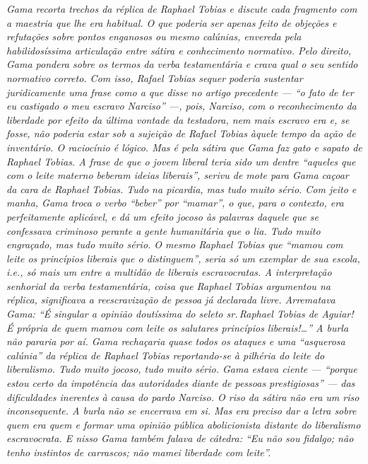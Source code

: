 \begin{didascalia}
\emph{Gama recorta trechos da réplica de Raphael Tobias e discute cada
fragmento com a maestria que lhe era habitual. O que poderia ser apenas
feito de objeções e refutações sobre pontos enganosos ou mesmo calúnias,
envereda pela habilidosíssima articulação entre sátira e conhecimento
normativo. Pelo direito, Gama pondera sobre os termos da verba
testamentária e crava qual o seu sentido normativo correto. Com isso,
Rafael Tobias sequer poderia sustentar juridicamente uma frase como a
que disse no artigo precedente --- ``o fato de ter eu castigado o meu
escravo Narciso'' ---, pois, Narciso, com o reconhecimento da liberdade por
efeito da última vontade da testadora, nem mais escravo era e, se fosse,
não poderia estar sob a sujeição de Rafael Tobias àquele tempo da ação
de inventário. O raciocínio é lógico. Mas é pela sátira que Gama faz
gato e sapato de Raphael Tobias. A frase de que o jovem liberal teria
sido um dentre ``aqueles que com o leite materno beberam ideias
liberais'', serivu de mote para Gama caçoar da cara de Raphael Tobias.
Tudo na picardia, mas tudo muito sério. Com jeito e manha, Gama troca o
verbo ``beber'' por ``mamar'', o que, para o contexto, era perfeitamente
aplicável, e dá um efeito jocoso às palavras daquele que se confessava
criminoso perante a gente humanitária que o lia. Tudo muito engraçado,
mas tudo muito sério. O mesmo Raphael Tobias que ``mamou com leite os
princípios liberais que o distinguem'', seria só um exemplar de sua
escola, i.e., só mais um entre a multidão de liberais escravocratas. A
interpretação senhorial da verba testamentária, coisa que Raphael Tobias
argumentou na réplica, significava a reescravização de pessoa já
declarada livre. Arrematava Gama: ``É singular a opinião doutíssima do
seleto sr.\,Raphael Tobias de Aguiar! É própria de quem mamou com leite
os salutares princípios liberais!\ldots'' A burla não pararia por aí.
Gama rechaçaria quase todos os ataques e uma ``asquerosa calúnia'' da
réplica de Raphael Tobias reportando-se à pilhéria do leite do
liberalismo. Tudo muito jocoso, tudo muito sério. Gama estava ciente ---
``porque estou certo da impotência das autoridades diante de pessoas
prestigiosas'' --- das dificuldades inerentes à causa do pardo Narciso. O
riso da sátira não era um riso inconsequente. A burla não se encerrava
em si. Mas era preciso dar a letra sobre quem era quem e formar uma
opinião pública abolicionista distante do liberalismo escravocrata. E
nisso Gama também falava de cátedra: ``Eu não sou fidalgo; não tenho
instintos de carrascos; não mamei liberdade com leite''.}
\end{didascalia}


